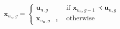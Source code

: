 \begin{equation}
\mathbf{x}_{{u_{n}, g}}=\left\{\begin{array}{ll}{\mathbf{u}_{{n}, g}} & {\text { if } \mathbf{x}_{{u_{n}, g-1}} \prec \mathbf{u}_{{n}, g}} \\ {\mathbf{x}_{{u_{n}}, g-1}} & {\text { otherwise }}\end{array}\right.
\label{fCDE-equation}
\end{equation}